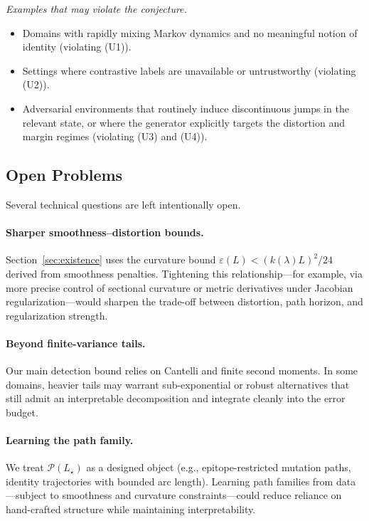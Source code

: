 \documentclass[11pt]{article}
\theoremstyle{remark}
\theoremstyle{plain}
\begin{document}
\noindent
\emph{Examples that may violate the conjecture.}
\begin{itemize}[leftmargin=1.6em,itemsep=2pt,topsep=2pt]
  \item Domains with rapidly mixing Markov dynamics and no meaningful notion of identity
        (violating (U1)).
  \item Settings where contrastive labels are unavailable or untrustworthy (violating (U2)).
  \item Adversarial environments that routinely induce discontinuous jumps in the relevant state,
        or where the generator explicitly targets the distortion and margin regimes (violating (U3)
        and (U4)).
\end{itemize}

\subsection{Open Problems}
\label{subsec:open-problems}

Several technical questions are left intentionally open.

\paragraph{Sharper smoothness--distortion bounds.}
Section~\ref{sec:existence} uses the curvature bound $\varepsilon(L) < (k(\lambda)L)^2/24$ derived
from smoothness penalties. Tightening this relationship---for example, via more precise control of
sectional curvature or metric derivatives under Jacobian regularization---would sharpen the trade-off
between distortion, path horizon, and regularization strength.

\paragraph{Beyond finite-variance tails.}
Our main detection bound relies on Cantelli and finite second moments. In some domains, heavier
tails may warrant sub-exponential or robust alternatives that still admit an interpretable decomposition
and integrate cleanly into the error budget.

\paragraph{Learning the path family.}
We treat $\mathcal{P}(L_\star)$ as a designed object (e.g., epitope-restricted mutation paths,
identity trajectories with bounded arc length). Learning path families from data---subject to
smoothness and curvature constraints---could reduce reliance on hand-crafted structure while
maintaining interpretability.
\end{document}
